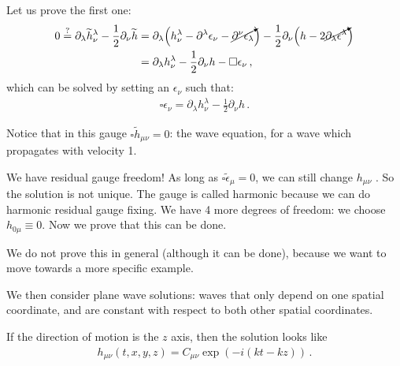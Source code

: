 \documentclass[main.tex]{subfiles}
\begin{document}
Let us prove the first one: 
%
\begin{subequations}
\begin{align}
0 \overset{?}{=} \partial_{\lambda } \widetilde{h}^{\lambda }_{\nu } - \frac{1}{2} \partial_{\nu }\widetilde{h}
&= \partial_{\lambda } \qty( h^{\lambda }_{\nu } - \partial^{\lambda } \epsilon_{\nu } - \cancelto{}{\partial^{\nu } \epsilon_{\lambda }} ) - \frac{1}{2} \partial_{\nu } \qty(h - 2 \cancelto{}{\partial_{\lambda } \epsilon^{\lambda }})  \\
&= \partial_{\lambda } h^{\lambda }_{\nu } - \frac{1}{2} \partial_{\nu } h  - \square \epsilon_{\nu }
\,,
\end{align}
\end{subequations}
%
which can be solved by setting an \(\epsilon_{\nu }\) such that:
%
\begin{align}
  \square  \epsilon_{\nu } = \partial_{\lambda } h^{\lambda }_{\nu } - \frac{1}{2} \partial_{\nu } h
\,.
\end{align}

Notice that in this gauge \(\square \widetilde{h}_{\mu \nu } = 0 \): the wave equation, for a wave which propagates with velocity 1. 

We have residual gauge freedom! As long as \(\square \widetilde{\epsilon}_{\mu} = 0\), we can still change \(h_{\mu \nu }\) .
So the solution is not unique. The gauge is called harmonic because we can do harmonic residual gauge fixing. 
We have 4 more degrees of freedom: we choose \(h_{0 \mu } \equiv 0\). Now we prove that this can be done. 

We do not prove this in general (although it can be done), because we want to move towards a more specific example. 

We then consider plane wave solutions: waves that only depend on one spatial coordinate, and are constant with respect to both other spatial coordinates. 

If the direction of motion is the \(z\) axis, then the solution looks like 
%
\begin{align}
h_{\mu \nu } (t, x, y, z) = C_{\mu \nu } \exp(-i (k t - k z ))
\,.
\end{align}
\end{document}
